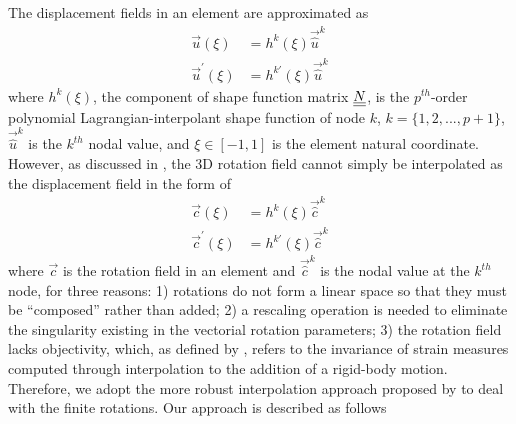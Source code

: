 The displacement fields in an element are approximated as
\begin{align}
    \label{InterpolateDisp}
    \vec{u}(\xi) &=  h^k(\xi) \vec{\hat{u}}^k \\
    \label{InterpolateDispp}
    \vec{u}^\prime(\xi) &=  h^{k\prime}(\xi) \vec{\hat{u}}^k
\end{align}
where $h^k(\xi)$, the component of shape function matrix $\underline{\underline{N}}$, is the $p^{th}$-order polynomial Lagrangian-interpolant shape function of node $k$, $k=\{1,2,...,p+1\}$, $\vec{\hat{u}}^k$ is the $k^{th}$ nodal value, and $\xi \in \left[-1,1\right]$ is the element natural coordinate.
However, as discussed in \cite{Bauchau-etal:2008}, the 3D rotation field cannot simply be interpolated as the displacement field in the form of
\begin{align}
    \label{InterpolateRot}
    \vec{c}(\xi) &= h^k(\xi) \vec{\hat{c}}^k \\
    \label{InterpolateRotp}
    \vec{c}^\prime(\xi) &= h^{k \prime}(\xi) \vec{\hat{c}}^k 
\end{align}    
where $\vec{c}$ is the rotation field in an element and $\vec{\hat{c}}^k$ is the nodal value at the $k^{th}$ node, for three reasons: 1) rotations do not form a linear space so that they must be  ``composed'' rather than added; 2) a rescaling operation is needed to eliminate the singularity existing in the vectorial rotation parameters; 3) the rotation field lacks objectivity, which, as defined by \cite{Crisfield1999}, refers to the invariance of strain measures computed through interpolation to the addition of a rigid-body motion. 
Therefore, we adopt the more robust interpolation approach proposed by \cite{Crisfield1999} to deal with the finite rotations. Our approach is described as follows
